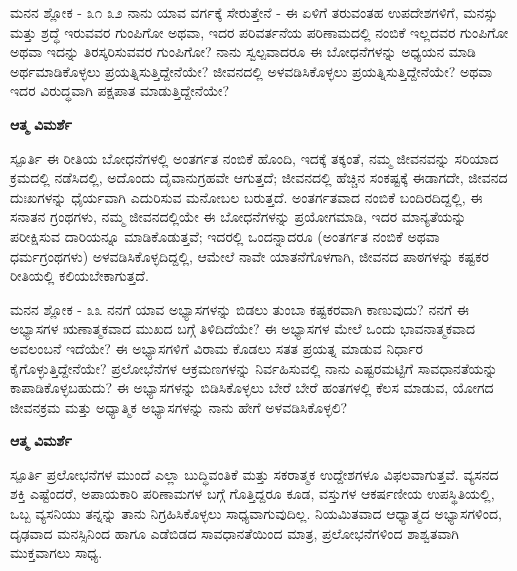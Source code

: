 \begin{mananam}{\mananamfont ಮನನ ಶ್ಲೋಕ - ೩೧ ೩೨}
\mananamtext ನಾನು ಯಾವ ವರ್ಗಕ್ಕೆ ಸೇರುತ್ತೇನೆ -  ಈ ಏಳಿಗೆ ತರುವಂತಹ ಉಪದೇಶಗಳಿಗೆ, ಮನಸ್ಸು ಮತ್ತು ಶ್ರದ್ಧೆ ಇರುವವರ ಗುಂಪಿಗೋ ಅಥವಾ, ಇದರ ಪರಿವರ್ತನೆಯ ಪರಿಣಾಮದಲ್ಲಿ ನಂಬಿಕೆ ಇಲ್ಲದವರ ಗುಂಪಿಗೋ ಅಥವಾ ಇದನ್ನು ತಿರಸ್ಕರಿಸುವವರ ಗುಂಪಿಗೋ? ನಾನು ಸ್ವಲ್ಪವಾದರೂ ಈ ಬೋಧನೆಗಳನ್ನು ಅಧ್ಯಯನ ಮಾಡಿ ಅರ್ಥಮಾಡಿಕೊಳ್ಳಲು ಪ್ರಯತ್ನಿಸುತ್ತಿದ್ದೇನೆಯೇ? ಜೀವನದಲ್ಲಿ ಅಳವಡಿಸಿಕೊಳ್ಳಲು ಪ್ರಯತ್ನಿಸುತ್ತಿದ್ದೇನೆಯೇ? ಅಥವಾ ಇದರ ವಿರುದ್ಧವಾಗಿ ಪಕ್ಷಪಾತ ಮಾಡುತ್ತಿದ್ದೇನೆಯೇ?
\end{mananam}
\WritingHand\enspace\textbf{ಆತ್ಮ ವಿಮರ್ಶೆ}\\
\begin{inspiration}{\mananamfont ಸ್ಪೂರ್ತಿ}
\ssmall \mananamtext ಈ ರೀತಿಯ ಬೋಧನೆಗಳಲ್ಲಿ ಅಂತರ್ಗತ ನಂಬಿಕೆ ಹೊಂದಿ, ಇದಕ್ಕೆ ತಕ್ಕಂತೆ, ನಮ್ಮ ಜೀವನವನ್ನು ಸರಿಯಾದ ಕ್ರಮದಲ್ಲಿ ನಡೆಸಿದಲ್ಲಿ, ಅದೊಂದು ದೈವಾನುಗ್ರಹವೇ ಆಗುತ್ತದೆ; ಜೀವನದಲ್ಲಿ ಹೆಚ್ಚಿನ  ಸಂಕಷ್ಟಕ್ಕೆ ಈಡಾಗದೇ, ಜೀವನದ ದುಃಖಗಳನ್ನು ಧೈರ್ಯವಾಗಿ ಎದುರಿಸುವ ಮನೋಬಲ ಬರುತ್ತದೆ.  ಅಂತರ್ಗತವಾದ ನಂಬಿಕೆ ಬಂದಿರದಿದ್ದಲ್ಲಿ, ಈ ಸನಾತನ ಗ್ರಂಥಗಳು, ನಮ್ಮ ಜೀವನದಲ್ಲಿಯೇ ಈ ಬೋಧನೆಗಳನ್ನು ಪ್ರಯೋಗಮಾಡಿ, ಇದರ ಮಾನ್ಯತೆಯನ್ನು ಪರೀಕ್ಷಿಸುವ ದಾರಿಯನ್ನೂ ಮಾಡಿಕೊಡುತ್ತವೆ; ಇದರಲ್ಲಿ ಒಂದನ್ನಾದರೂ (ಅಂತರ್ಗತ ನಂಬಿಕೆ ಅಥವಾ ಧರ್ಮಗ್ರಂಥಗಳು) ಅಳವಡಿಸಿಕೊಳ್ಳದಿದ್ದಲ್ಲಿ, ಆಮೇಲೆ ನಾವೇ ಯಾತನೆಗೊಳಗಾಗಿ, ಜೀವನದ ಪಾಠಗಳನ್ನು ಕಷ್ಟಕರ ರೀತಿಯಲ್ಲಿ ಕಲಿಯಬೇಕಾಗುತ್ತದೆ. 
\end{inspiration}
\newpage

\begin{mananam}{\mananamfont ಮನನ ಶ್ಲೋಕ - ೩೩}
\mananamtext ನನಗೆ ಯಾವ ಅಭ್ಯಾಸಗಳನ್ನು ಬಿಡಲು ತುಂಬಾ ಕಷ್ಟಕರವಾಗಿ ಕಾಣುವುದು? ನನಗೆ ಈ ಅಭ್ಯಾಸಗಳ ಋಣಾತ್ಮಕವಾದ ಮುಖದ ಬಗ್ಗೆ ತಿಳಿದಿದೆಯೇ? ಈ ಅಭ್ಯಾಸಗಳ ಮೇಲೆ ಒಂದು ಭಾವನಾತ್ಮಕವಾದ ಅವಲಂಬನೆ ಇದೆಯೇ? ಈ ಅಭ್ಯಾಸಗಳಿಗೆ ವಿರಾಮ ಕೊಡಲು ಸತತ ಪ್ರಯತ್ನ ಮಾಡುವ ನಿರ್ಧಾರ ಕೈಗೊಳ್ಳುತ್ತಿದ್ದೇನೆಯೇ? ಪ್ರಲೋಭೆನೆಗಳ ಆಕ್ರಮಣಗಳನ್ನು ನಿರ್ವಹಿಸುವಲ್ಲಿ ನಾನು ಎಷ್ಟರಮಟ್ಟಿಗೆ ಸಾವಧಾನತೆಯನ್ನು ಕಾಪಾಡಿಕೊಳ್ಳಬಹುದು? ಈ ಅಭ್ಯಾಸಗಳನ್ನು ಬಿಡಿಸಿಕೊಳ್ಳಲು ಬೇರೆ ಬೇರೆ ಹಂತಗಳಲ್ಲಿ ಕೆಲಸ ಮಾಡುವ, ಯೋಗದ ಜೀವನಕ್ರಮ ಮತ್ತು ಅಧ್ಯಾತ್ಮಿಕ ಅಭ್ಯಾಸಗಳನ್ನು ನಾನು ಹೇಗೆ ಅಳವಡಿಸಿಕೊಳ್ಳಲಿ?
\end{mananam}
\WritingHand\enspace\textbf{ಆತ್ಮ ವಿಮರ್ಶೆ}\\
\begin{inspiration}{\mananamfont ಸ್ಪೂರ್ತಿ}
\mananamtext ಪ್ರಲೋಭನೆಗಳ ಮುಂದೆ ಎಲ್ಲಾ ಬುದ್ಧಿವಂತಿಕೆ ಮತ್ತು ಸಕರಾತ್ಮಕ ಉದ್ದೇಶಗಳೂ ವಿಫಲವಾಗುತ್ತವೆ. ವ್ಯಸನದ ಶಕ್ತಿ ಎಷ್ಟೆಂದರೆ, ಅಪಾಯಕಾರಿ ಪರಿಣಾಮಗಳ ಬಗ್ಗೆ ಗೊತ್ತಿದ್ದರೂ ಕೂಡ, ವಸ್ತುಗಳ ಆಕರ್ಷಣೀಯ ಉಪಸ್ಥಿತಿಯಲ್ಲಿ, ಒಬ್ಬ ವ್ಯಸನಿಯು ತನ್ನನ್ನು ತಾನು ನಿಗ್ರಹಿಸಿಕೊಳ್ಳಲು ಸಾಧ್ಯವಾಗುವುದಿಲ್ಲ. ನಿಯಮಿತವಾದ ಆಧ್ಯಾತ್ಮದ ಅಭ್ಯಾಸಗಳಿಂದ, ದೃಢವಾದ ಮನಸ್ಸಿನಿಂದ ಹಾಗೂ ಎಡೆಬಿಡದ ಸಾವಧಾನತೆಯಿಂದ ಮಾತ್ರ, ಪ್ರಲೋಭನೆಗಳಿಂದ ಶಾಶ್ವತವಾಗಿ ಮುಕ್ತವಾಗಲು ಸಾಧ್ಯ.
\end{inspiration}
\newpage

